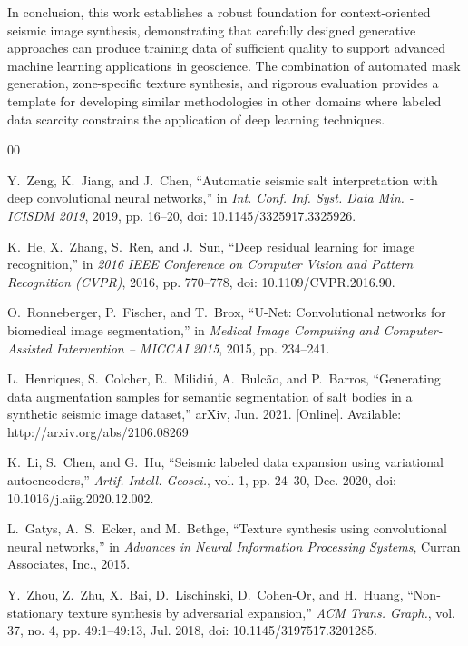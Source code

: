\documentclass{ieeeaccess}
\begin{document}
In conclusion, this work establishes a robust foundation for context-oriented seismic image synthesis, demonstrating that carefully designed generative approaches can produce training data of sufficient quality to support advanced machine learning applications in geoscience. The combination of automated mask generation, zone-specific texture synthesis, and rigorous evaluation provides a template for developing similar methodologies in other domains where labeled data scarcity constrains the application of deep learning techniques.


\begin{thebibliography}{00}

Y.~Zeng, K.~Jiang, and J.~Chen, ``Automatic seismic salt interpretation with deep convolutional neural networks,'' in \emph{Int. Conf. Inf. Syst. Data Min. - ICISDM 2019}, 2019, pp. 16--20, doi: 10.1145/3325917.3325926.

K.~He, X.~Zhang, S.~Ren, and J.~Sun, ``Deep residual learning for image recognition,'' in \emph{2016 IEEE Conference on Computer Vision and Pattern Recognition (CVPR)}, 2016, pp. 770--778, doi: 10.1109/CVPR.2016.90.

O.~Ronneberger, P.~Fischer, and T.~Brox, ``U-Net: Convolutional networks for biomedical image segmentation,'' in \emph{Medical Image Computing and Computer-Assisted Intervention -- MICCAI 2015}, 2015, pp. 234--241.

L.~Henriques, S.~Colcher, R.~Milidiú, A.~Bulcão, and P.~Barros, ``Generating data augmentation samples for semantic segmentation of salt bodies in a synthetic seismic image dataset,'' arXiv, Jun. 2021. [Online]. Available: http://arxiv.org/abs/2106.08269

K.~Li, S.~Chen, and G.~Hu, ``Seismic labeled data expansion using variational autoencoders,'' \emph{Artif. Intell. Geosci.}, vol. 1, pp. 24--30, Dec. 2020, doi: 10.1016/j.aiig.2020.12.002.

L.~Gatys, A.~S.~Ecker, and M.~Bethge, ``Texture synthesis using convolutional neural networks,'' in \emph{Advances in Neural Information Processing Systems}, Curran Associates, Inc., 2015.

Y.~Zhou, Z.~Zhu, X.~Bai, D.~Lischinski, D.~Cohen-Or, and H.~Huang, ``Non-stationary texture synthesis by adversarial expansion,'' \emph{ACM Trans. Graph.}, vol. 37, no. 4, pp. 49:1--49:13, Jul. 2018, doi: 10.1145/3197517.3201285.


\end{thebibliography}
\end{document}
